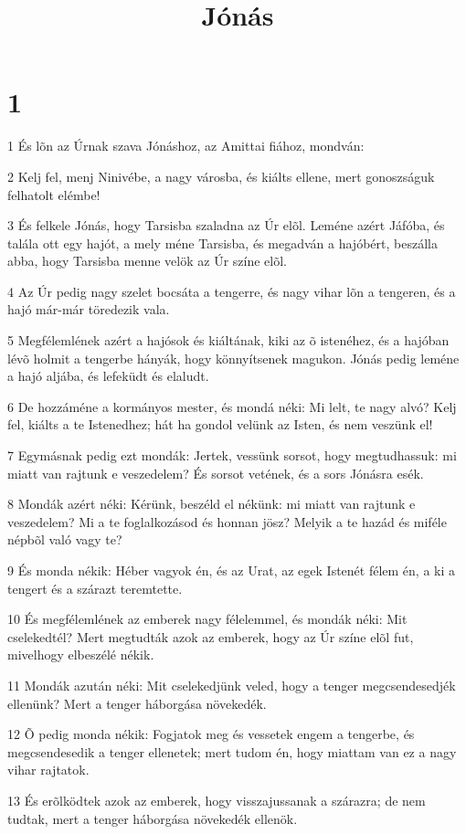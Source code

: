 

\title{Jónás}


\chapter{1}

\par 1 És lõn az Úrnak szava Jónáshoz, az Amittai fiához, mondván:
\par 2 Kelj fel, menj Ninivébe, a nagy városba, és kiálts ellene, mert gonoszságuk felhatolt elémbe!
\par 3 És felkele Jónás, hogy Tarsisba szaladna az Úr elõl. Leméne azért Jáfóba, és talála ott egy hajót, a mely méne Tarsisba, és megadván a hajóbért, beszálla abba, hogy Tarsisba menne velök az Úr színe elõl.
\par 4 Az Úr pedig nagy szelet bocsáta a tengerre, és nagy vihar lõn a tengeren, és a hajó már-már töredezik vala.
\par 5 Megfélemlének azért a hajósok és kiáltának, kiki az õ istenéhez, és a hajóban lévõ holmit a tengerbe hányák, hogy könnyítsenek magukon. Jónás pedig leméne a hajó aljába, és lefeküdt és elaludt.
\par 6 De hozzáméne a kormányos mester, és mondá néki: Mi lelt, te nagy alvó? Kelj fel, kiálts a te Istenedhez; hát ha gondol velünk az Isten, és nem veszünk el!
\par 7 Egymásnak pedig ezt mondák: Jertek, vessünk sorsot, hogy megtudhassuk: mi miatt van rajtunk e veszedelem? És sorsot vetének, és a sors Jónásra esék.
\par 8 Mondák azért néki: Kérünk, beszéld el nékünk: mi miatt van rajtunk e veszedelem? Mi a te foglalkozásod és honnan jösz? Melyik a te hazád és miféle népbõl való vagy te?
\par 9 És monda nékik: Héber vagyok én, és az Urat, az egek Istenét félem én, a ki a tengert és a szárazt teremtette.
\par 10 És megfélemlének az emberek nagy félelemmel, és mondák néki: Mit cselekedtél? Mert megtudták azok az emberek, hogy az Úr színe elõl fut, mivelhogy elbeszélé nékik.
\par 11 Mondák azután néki: Mit cselekedjünk veled, hogy a tenger megcsendesedjék ellenünk? Mert a tenger háborgása növekedék.
\par 12 Õ pedig monda nékik: Fogjatok meg és vessetek engem a tengerbe, és megcsendesedik a tenger ellenetek; mert tudom én, hogy miattam van ez a nagy vihar rajtatok.
\par 13 És erõlködtek azok az emberek, hogy visszajussanak a szárazra; de nem tudtak, mert a tenger háborgása növekedék ellenök.

